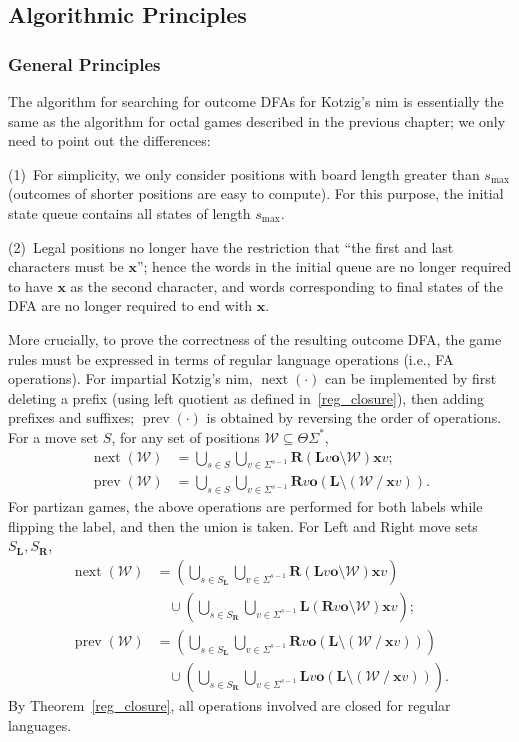 \documentclass[11pt]{article}
\theoremstyle{definition}
\theoremstyle{plain}
\newcommand{\rmL}{\mathbf{L}}
\newcommand{\rmR}{\mathbf{R}}
\newcommand{\x}{\mathbf{x}}
\newcommand{\e}{\mathbf{o}}
\newcommand{\varW}{\mathcal{W}}
\newcommand{\nxt}{\operatorname{next}}
\newcommand{\prv}{\operatorname{prev}}
\begin{document}
\subsection{Algorithmic Principles}

\subsubsection{General Principles}

The algorithm for searching for outcome DFAs for Kotzig's nim is essentially the same as the algorithm for octal games described in the previous chapter; we only need to point out the differences:

(1)~For simplicity, we only consider positions with board length greater than $s_{\max}$ (outcomes of shorter positions are easy to compute). For this purpose, the initial state queue contains all states of length $s_{\max}$.

(2)~Legal positions no longer have the restriction that ``the first and last characters must be $\x$''; hence the words in the initial queue are no longer required to have $\x$ as the second character, and words corresponding to final states of the DFA are no longer required to end with $\x$.

More crucially, to prove the correctness of the resulting outcome DFA, the game rules must be expressed in terms of regular language operations (i.e., FA operations).
For impartial Kotzig's nim, $\nxt(\cdot)$ can be implemented by first deleting a prefix (using left quotient as defined in~\ref{reg_closure}), then adding prefixes and suffixes; $\prv(\cdot)$ is obtained by reversing the order of operations.
For a move set $S$, for any set of positions $\varW \subseteq \varTheta\varSigma^*$,
\begin{align*}
    \nxt(\varW) &= \bigcup_{s\in S} \bigcup_{v\in\varSigma^{s-1}} \rmR (\rmL v\e \setminus \varW) \x v;\\
    \prv(\varW) &= \bigcup_{s\in S} \bigcup_{v\in\varSigma^{s-1}} \rmR v\e (\rmL \setminus (\varW ~/~ \x v)).
\end{align*}
For partizan games, the above operations are performed for both labels while flipping the label, and then the union is taken. For Left and Right move sets $S_{\rmL}, S_{\rmR}$,
\begin{align*}
    \nxt(\varW) &= \left(\bigcup_{s\in S_{\rmL}} \bigcup_{v\in\varSigma^{s-1}} \rmR (\rmL v\e \setminus \varW) \x v\right) \\
            &~~~~ \cup \left(\bigcup_{s\in S_{\rmR}} \bigcup_{v\in\varSigma^{s-1}} \rmL (\rmR v\e \setminus \varW) \x v\right);\\
    \prv(\varW) &= \left(\bigcup_{s\in S_{\rmL}} \bigcup_{v\in\varSigma^{s-1}} \rmR v\e (\rmL \setminus (\varW ~/~ \x v))\right) \\
            &~~~~ \cup \left(\bigcup_{s\in S_{\rmR}} \bigcup_{v\in\varSigma^{s-1}} \rmL v\e (\rmL \setminus (\varW ~/~ \x v))\right).
\end{align*}
By Theorem~\ref{reg_closure}, all operations involved are closed for regular languages.
\end{document}
